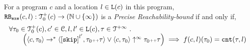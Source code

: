 \begin{defn}
 \label{def:exe_rb}
 For a program ${c}$ and a location $l \in \mathtt{L}(c)$ in this program,
$\mathtt{RB_{exe}}({c}, l): \mathcal{T}^{+}_0(c) \to (\mathbb{N} \cup \{\infty\})$ is a \emph{Precise Reachability-bound} if and only if,
\[
 \begin{array}{l}
 \forall \trace_0 \in \ftdom_0(c), c' \in \cdom, l, l' \in \progl(c), \trace \in \tdom \st 
 \\ \qquad
 \Big(
 \config{{c}, \trace_0} \to^{*} \config{\clabel{\eskip}^{l'}, \trace_0 \tracecat \trace} 
 \lor 
 \config{{c}, \trace_0} \uparrow^{\infty} \trace_0 \tracecat \trace 
 \Big)
 \implies f({c}, l)(\trace_0) = \counter(\trace, l) 
 \end{array}
 \]
\end{defn}

